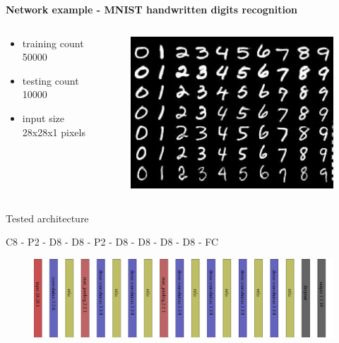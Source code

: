 \documentclass[xcolor=dvipsnames]{beamer}
\begin{document}
\begin{frame}{\bf Network example - MNIST handwritten digits recognition}



\begin{columns}
\begin{column}{0.5\textwidth}

\begin{itemize}
  \item training count 50000
  \item testing count 10000
  \item input size 28x28x1 pixels
\end{itemize}

\end{column}
\begin{column}{0.5\textwidth}  %

\begin{figure}
  \includegraphics[scale=0.2]{../../pictures/mnist.jpg}
\end{figure}

\end{column}
\end{columns}

Tested architecture

C8 - P2 - D8 - D8 - P2 - D8 - D8 - D8 - D8 - FC

\begin{figure}
  \includegraphics[scale=0.14]{../../diagrams/cnn_architecture.png}
\end{figure}

\end{frame}
\end{document}
